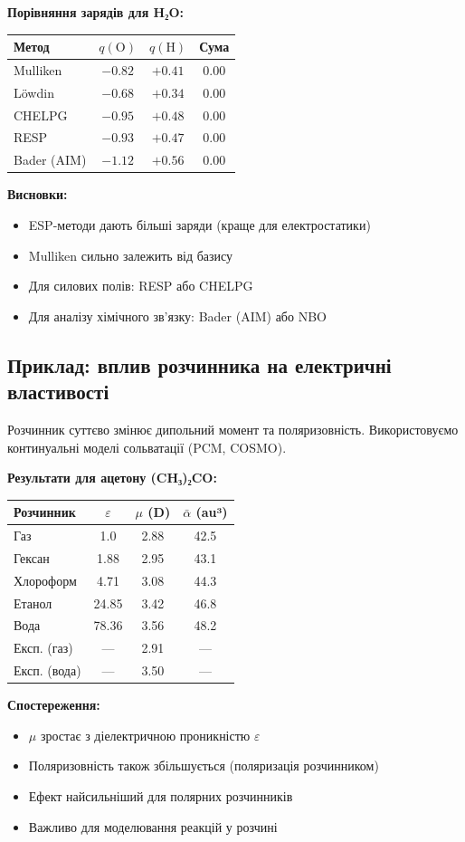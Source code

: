 
\textbf{Порівняння зарядів для H₂O:}
\begin{center}
\begin{tabular}{lccc}
\toprule
Метод & $q(\text{O})$ & $q(\text{H})$ & Сума \\
\midrule
Mulliken      & $-0.82$ & $+0.41$ & 0.00 \\
Löwdin        & $-0.68$ & $+0.34$ & 0.00 \\
CHELPG        & $-0.95$ & $+0.48$ & 0.00 \\
RESP          & $-0.93$ & $+0.47$ & 0.00 \\
\midrule
Bader (AIM)   & $-1.12$ & $+0.56$ & 0.00 \\
\bottomrule
\end{tabular}
\end{center}

\textbf{Висновки:}
\begin{itemize}
    \item ESP-методи дають більші заряди (краще для електростатики)
    \item Mulliken сильно залежить від базису
    \item Для силових полів: RESP або CHELPG
    \item Для аналізу хімічного зв'язку: Bader (AIM) або NBO
\end{itemize}

\subsection{Приклад: вплив розчинника на електричні властивості}

Розчинник суттєво змінює дипольний момент та поляризовність.
Використовуємо континуальні моделі сольватації (PCM, COSMO).


\textbf{Результати для ацетону (CH₃)₂CO:}
\begin{center}
\begin{tabular}{lccc}
\toprule
Розчинник & $\varepsilon$ & $\mu$ (D) & $\bar{\alpha}$ (au³) \\
\midrule
Газ              & 1.0   & 2.88 & 42.5 \\
Гексан           & 1.88  & 2.95 & 43.1 \\
Хлороформ        & 4.71  & 3.08 & 44.3 \\
Етанол           & 24.85 & 3.42 & 46.8 \\
Вода             & 78.36 & 3.56 & 48.2 \\
\midrule
Експ. (газ)      & ---   & 2.91 & --- \\
Експ. (вода)     & ---   & 3.50 & --- \\
\bottomrule
\end{tabular}
\end{center}

\textbf{Спостереження:}
\begin{itemize}
    \item $\mu$ зростає з діелектричною проникністю $\varepsilon$
    \item Поляризовність також збільшується (поляризація розчинником)
    \item Ефект найсильніший для полярних розчинників
    \item Важливо для моделювання реакцій у розчині
\end{itemize}
